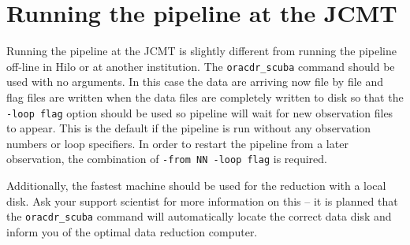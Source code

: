 \documentclass[twoside,11pt,nolof]{starlink}
\begin{document}
\section{Running the pipeline at the JCMT}

Running the pipeline at the JCMT is slightly different from running the pipeline
off-line in Hilo or at another institution.  The \texttt{oracdr\_scuba} command
should be used with no arguments.  In this case the data are arriving now file
by file and flag files are written when the data files are completely written
to disk so that the \texttt{-loop flag} option should be used so pipeline will
wait for new observation files to appear. This is the default if the pipeline
is run without any observation numbers or loop specifiers.  In order to
restart the pipeline from a later observation, the combination of
\texttt{-from NN -loop flag} is required.

Additionally, the fastest machine should be used for the reduction
with a local disk. Ask your support scientist for more information
on this -- it is planned that the \texttt{oracdr\_scuba} command
will automatically locate the correct data disk and inform you
of the optimal data reduction computer.



\end{document}
